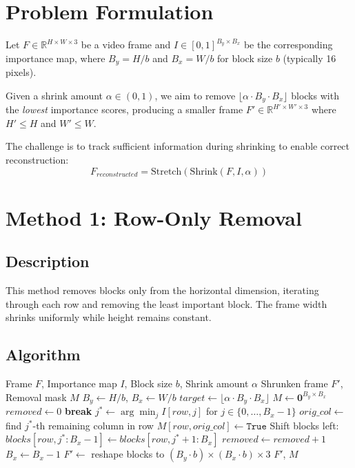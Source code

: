 \documentclass[11pt,a4paper]{article}
\begin{document}
\section{Problem Formulation}

Let $F \in \mathbb{R}^{H \times W \times 3}$ be a video frame and $I \in [0,1]^{B_y \times B_x}$ be the corresponding importance map, where $B_y = H/b$ and $B_x = W/b$ for block size $b$ (typically 16 pixels).

Given a shrink amount $\alpha \in (0,1)$, we aim to remove $\lfloor \alpha \cdot B_y \cdot B_x \rfloor$ blocks with the \emph{lowest} importance scores, producing a smaller frame $F' \in \mathbb{R}^{H' \times W' \times 3}$ where $H' \leq H$ and $W' \leq W$.

The challenge is to track sufficient information during shrinking to enable correct reconstruction:
\begin{equation}
    F_{reconstructed} = \text{Stretch}(\text{Shrink}(F, I, \alpha))
\end{equation}

\section{Method 1: Row-Only Removal}

\subsection{Description}
This method removes blocks only from the horizontal dimension, iterating through each row and removing the least important block. The frame width shrinks uniformly while height remains constant.

\subsection{Algorithm}

\begin{algorithm}[H]
\caption{Shrink Frame (Row-Only)}
\begin{algorithmic}[1]
\Require Frame $F$, Importance map $I$, Block size $b$, Shrink amount $\alpha$
\Ensure Shrunken frame $F'$, Removal mask $M$
\State $B_y \gets H/b$, $B_x \gets W/b$
\State $target \gets \lfloor \alpha \cdot B_y \cdot B_x \rfloor$
\State $M \gets \mathbf{0}^{B_y \times B_x}$ 
\State $removed \gets 0$
            \textbf{break}
        \EndIf
        \State $j^* \gets \arg\min_j I[row, j]$ for $j \in \{0, \ldots, B_x-1\}$
        \State $orig\_col \gets$ find $j^*$-th remaining column in row
        \State $M[row, orig\_col] \gets \texttt{True}$
        \State Shift blocks left: $blocks[row, j^*:B_x-1] \gets blocks[row, j^*+1:B_x]$
        \State $removed \gets removed + 1$
    \EndFor
    \State $B_x \gets B_x - 1$
\EndWhile
\State $F' \gets$ reshape blocks to $(B_y \cdot b) \times (B_x \cdot b) \times 3$
\State \Return $F'$, $M$
\end{algorithmic}
\end{algorithm}
\end{document}
